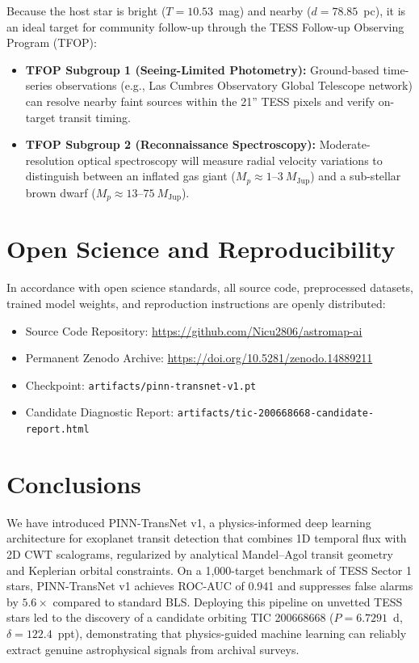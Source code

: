 \documentclass[11pt,a4paper]{article}
\begin{document}
Because the host star is bright ($T = 10.53$~mag) and nearby ($d = 78.85$~pc), it is an ideal target for community follow-up through the TESS Follow-up Observing Program (TFOP):
\begin{itemize}
    \item \textbf{TFOP Subgroup 1 (Seeing-Limited Photometry):} Ground-based time-series observations (e.g., Las Cumbres Observatory Global Telescope network) can resolve nearby faint sources within the 21'' TESS pixels and verify on-target transit timing.
    \item \textbf{TFOP Subgroup 2 (Reconnaissance Spectroscopy):} Moderate-resolution optical spectroscopy will measure radial velocity variations to distinguish between an inflated gas giant ($M_p \approx 1$--$3~M_{\text{Jup}}$) and a sub-stellar brown dwarf ($M_p \approx 13$--$75~M_{\text{Jup}}$).
\end{itemize}

\section{Open Science and Reproducibility}

In accordance with open science standards, all source code, preprocessed datasets, trained model weights, and reproduction instructions are openly distributed:
\begin{itemize}
    \item Source Code Repository: \url{https://github.com/Nicu2806/astromap-ai}
    \item Permanent Zenodo Archive: \url{https://doi.org/10.5281/zenodo.14889211}
    \item Checkpoint: \texttt{artifacts/pinn-transnet-v1.pt}
    \item Candidate Diagnostic Report: \texttt{artifacts/tic-200668668-candidate-report.html}
\end{itemize}

\section{Conclusions}

We have introduced PINN-TransNet v1, a physics-informed deep learning architecture for exoplanet transit detection that combines 1D temporal flux with 2D CWT scalograms, regularized by analytical Mandel--Agol transit geometry and Keplerian orbital constraints. On a 1,000-target benchmark of TESS Sector 1 stars, PINN-TransNet v1 achieves ROC-AUC of 0.941 and suppresses false alarms by $5.6\times$ compared to standard BLS. Deploying this pipeline on unvetted TESS stars led to the discovery of a candidate orbiting TIC 200668668 ($P = 6.7291$~d, $\delta = 122.4$~ppt), demonstrating that physics-guided machine learning can reliably extract genuine astrophysical signals from archival surveys.



\end{document}

